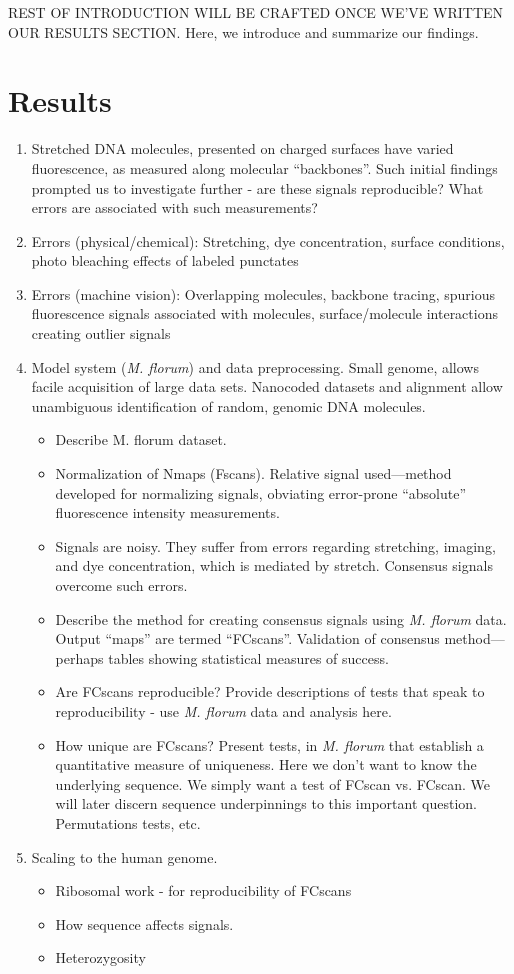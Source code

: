 \documentclass[11pt]{extarticle} %
\begin{document}
REST OF INTRODUCTION WILL BE CRAFTED ONCE WE’VE WRITTEN OUR RESULTS SECTION. Here, we introduce and summarize our findings.

\section*{Results}
\begin{enumerate}
\item Stretched DNA molecules, presented on charged surfaces have varied fluorescence, as measured along molecular ``backbones''. Such initial findings prompted us to investigate further - are these signals reproducible? What errors are associated with such measurements?
\item Errors (physical/chemical): Stretching, dye concentration, surface conditions, photo bleaching effects of labeled punctates
\item Errors (machine vision): Overlapping molecules, backbone tracing, spurious fluorescence signals associated with molecules, surface/molecule interactions creating outlier signals
\item Model system ({\emph{M. florum}}) and data preprocessing. Small genome, allows facile acquisition of large data sets. Nanocoded datasets and alignment allow unambiguous identification of random, genomic DNA molecules.
\begin{itemize}
\item Describe M. florum dataset.
\item Normalization of Nmaps (Fscans). Relative signal used—method developed for normalizing signals, obviating error-prone “absolute” fluorescence intensity measurements.
\item Signals are noisy. They suffer from errors regarding stretching, imaging, and dye concentration, which is mediated by stretch. Consensus signals overcome such errors.
\item Describe the method for creating consensus signals using {\emph{M. florum}} data. Output ``maps'' are termed ``FCscans''. Validation of consensus method—perhaps tables showing statistical measures of success.
\item Are FCscans reproducible? Provide descriptions of tests that speak to reproducibility - use {\emph{M. florum}} data and analysis here.
\item How unique are FCscans? Present tests, in {\emph{M. florum}} that establish a quantitative measure of uniqueness. Here we don’t want to know the underlying sequence. We simply want a test of FCscan vs. FCscan. We will later discern sequence underpinnings to this important question. Permutations tests, etc.
\end{itemize}
\item Scaling to the human genome. 
\begin{itemize}
\item Ribosomal work - for reproducibility of FCscans
\item How sequence affects signals.
\item Heterozygosity
\end{itemize}
\end{enumerate}
\end{document}
